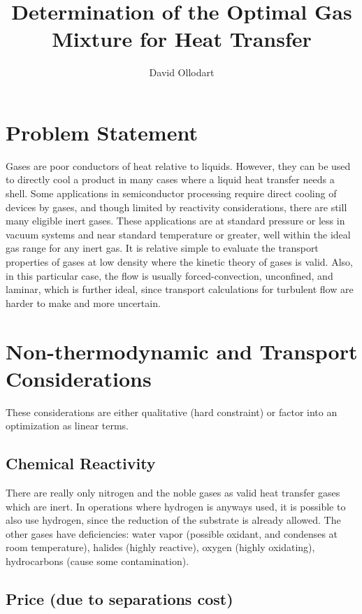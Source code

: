 \documentclass{article}
\title{Determination of the Optimal Gas Mixture for Heat Transfer}
\author{David Ollodart}
\begin{document}
%
\maketitle
\tableofcontents
%
\section{Problem Statement}

Gases are poor conductors of heat relative to liquids. However, they
can be used to directly cool a product in many cases where a liquid
heat transfer needs a shell. Some applications in semiconductor
processing require direct cooling of devices by gases, and though
limited by reactivity considerations, there are still many eligible
inert gases. These applications are at standard pressure or less in
vacuum systems and near standard temperature or greater, well within the
ideal gas range for any inert gas. It is relative simple to evaluate the
transport properties of gases at low density where the kinetic theory
of gases is valid. Also, in this particular case, the flow is usually
forced-convection, unconfined, and laminar, which is further ideal,
since transport calculations for turbulent flow are harder to make and
more uncertain.

\section{Non-thermodynamic and Transport Considerations}

These considerations are either qualitative (hard constraint) or factor
into an optimization as linear terms.

\subsection{Chemical Reactivity}

There are really only nitrogen and the noble gases as valid heat
transfer gases which are inert. In operations where hydrogen is anyways
used, it is possible to also use hydrogen, since the reduction of the
substrate is already allowed. The other gases have deficiencies: water
vapor (possible oxidant, and condenses at room temperature), halides
(highly reactive), oxygen (highly oxidating), hydrocarbons (cause some
contamination).

\subsection{Price (due to separations cost)}
\end{document}
